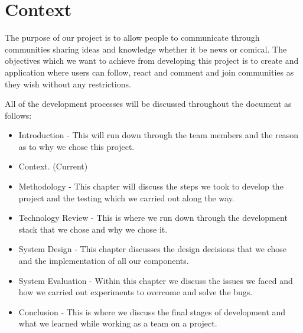 \chapter{Context}
The purpose of our project is to allow people to communicate through communities sharing ideas and knowledge whether it be news or comical. The objectives which we want to achieve from developing this project is to create and application where users can follow, react and comment and join communities as they wish without any restrictions.

All of the development processes will be discussed throughout the document as follows:

\begin{itemize}
\item Introduction - This will run down through the team members and the reason as to why we chose this project.

\item Context. (Current)

\item Methodology - This chapter will discuss the steps we took to develop the project and the testing which we carried out along the way.

\item Technology Review - This is where we run down through the development stack that we chose and why we chose it. 

\item System Design - This chapter discusses the design decisions that we chose and the implementation of all our components.

\item System Evaluation - Within this chapter we discuss the issues we faced and how we carried out experiments to overcome and solve the bugs.

\item Conclusion - This is where we discuss the final stages of development and what we learned while working as a team on a project.
\end{itemize}

